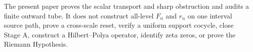 \documentclass[12pt]{article}
\begin{document}
The present paper proves the scalar transport and sharp obstruction and
audits a finite outward tube.  It does not construct all-level $F_n$ and
$r_n$ on one interval source path, prove a cross-scale reset, verify a
uniform support cocycle, close Stage A, construct a Hilbert--Polya operator,
identify zeta zeros, or prove the Riemann Hypothesis.



\end{document}
